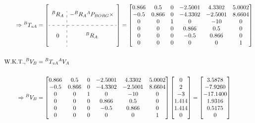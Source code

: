 \documentclass[a4paper]{article}
\begin{document}
\begin{qalist}
\begin{align} {}
				\Rightarrow {}^{B}T_{\textit{v}A} &= \left[\begin{array}{c:c} \\{}^{B}R_{A} & - {}^{B}R_{A}  {}^{A}P_{BORG}\times \\ \\ \hdashline \\ 0 &  {}^{B}R_{A} \\ \;\end{array} \right] = \begin{bmatrix}0.866 & 0.5 & 0 & -2.5001 & 4.3302 & 5.0002 \\ -0.5 & 0.866 & 0 & -4.3302 & -2.5001 & 8.6604 \\ 0 & 0 & 1 & 0 & -10 & 0 \\ 0 & 0 & 0 & 0.866 & 0.5 & 0 \\ 0 & 0 & 0 & -0.5 & 0.866 & 0 \\ 0 & 0 & 0 & 0 & 0 & 1\end{bmatrix} \\ \notag\\ \text{W.K.T.,} {}^{B}V_{B} &= {}^{B}T_{\textit{v}A} {}^{A}V_{A}\\ \notag \\ 
				\Rightarrow {}^{B}V_{B} &= \begin{bmatrix}0.866 & 0.5 & 0 & -2.5001 & 4.3302 & 5.0002 \\ -0.5 & 0.866 & 0 & -4.3302 & -2.5001 & 8.6604 \\ 0 & 0 & 1 & 0 & -10 & 0 \\ 0 & 0 & 0 & 0.866 & 0.5 & 0 \\ 0 & 0 & 0 & -0.5 & 0.866 & 0 \\ 0 & 0 & 0 & 0 & 0 & 1\end{bmatrix}  \begin{bmatrix}0 \\ 2 \\ -3 \\ 1.414 \\ 1.414 \\ 0 \end{bmatrix} = \begin{bmatrix}3.5878 \\ -7.9260 \\ -17.1400 \\ 1.9316 \\ 0.5175 \\ 0\end{bmatrix}
			\end{align}
		

\end{qalist}
\end{document}
